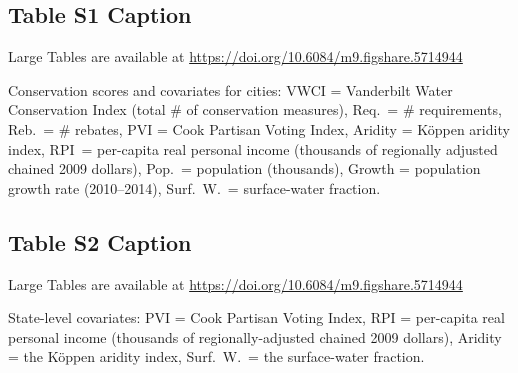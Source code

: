 \documentclass[draft]{agujournal}\usepackage{knitr}
\begin{document}
\subsection*{Table S1 Caption}
\begin{table}[H]
\centering
Large Tables are available at \url{https://doi.org/10.6084/m9.figshare.5714944}
\caption{Conservation scores and covariates for  cities: VWCI = Vanderbilt Water Conservation Index (total \# of conservation measures), Req.\ = \# requirements, Reb.\ = \# rebates, PVI = Cook Partisan Voting Index, Aridity = K\"oppen aridity index, RPI\ = per-capita real personal income (thousands of regionally adjusted chained 2009 dollars), Pop.\ = population (thousands), Growth = population growth rate (2010--2014), Surf.\ W.\ = surface-water fraction.}
\label{tab:vwci}
\end{table}

\subsection*{Table S2 Caption}
\begin{table}[H]
\centering
Large Tables are available at \url{https://doi.org/10.6084/m9.figshare.5714944}
\caption{State-level covariates: PVI = Cook Partisan Voting Index, RPI = per-capita real personal income (thousands of regionally-adjusted chained 2009 dollars), Aridity = the K\"oppen aridity index, Surf.\ W.\ = the surface-water fraction.}
\label{tab:state}
\end{table}
\end{document}
